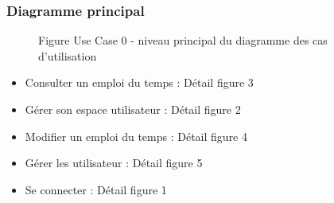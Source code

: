 \documentclass[a4paper, 11pt]{article}
\begin{document}
        \subsubsection{ Diagramme principal}
        \begin{figure}[h]
        \caption{Figure Use Case 0 - niveau principal du diagramme des cas d'utilisation}
        \label{fig-diag-use-case-0}
        \end{figure}
        \begin{itemize}
        \item Consulter un emploi du temps : Détail figure 3
        \item Gérer son espace utilisateur : Détail figure 2
        \item Modifier un emploi du temps  : Détail figure 4
        \item Gérer les utilisateur        : Détail figure 5
        \item Se connecter                 : Détail figure 1
        \end{itemize}
	\clearpage
\end{document}
